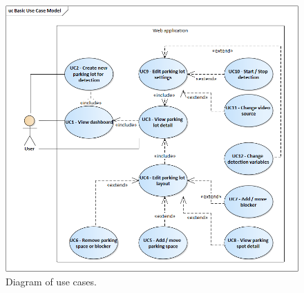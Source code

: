 \documentclass[thesis=M,english]{FITthesis}[2019/03/06]
\begin{document}
\begin{figure}[ht!]
	\centering
	\includegraphics[width=\textwidth]{imgs/uc-diagram.png}
	\caption{Diagram of use cases.}
	\label{label:uc_diagram}
\end{figure}
\end{document}

